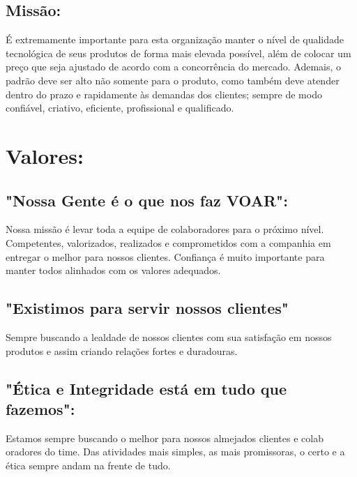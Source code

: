 	
\subsection{Missão:}
	É extremamente importante para esta organização manter o nível de qualidade tecnológica de seus produtos de forma mais elevada possível, além de colocar um preço que seja ajustado de acordo com a concorrência do mercado.
Ademais, o padrão deve ser alto não somente para o produto, como também deve atender dentro do prazo e rapidamente às demandas dos clientes; sempre de modo confiável, criativo, eficiente, profissional e qualificado.


	
    \section{Valores:}

	\begin{description}
 	 \subsection{"Nossa Gente é o que nos faz VOAR":} 
            Nossa missão é levar toda a equipe de colaboradores para o próximo nível.
             Competentes, valorizados, realizados e comprometidos com a companhia em entregar o melhor para nossos clientes.
              Confiança é muito importante para manter todos alinhados com os valores adequados.
            \end{description}

            \begin{description}
                \subsection{"Existimos para servir nossos clientes"} 
                Sempre buscando a lealdade de nossos clientes com
                sua satisfação em nossos produtos e assim criando relações fortes e duradouras.
                \end{description}

                \begin{description}
                    \subsection{"Ética e Integridade está em tudo que fazemos":} 
                    Estamos sempre buscando o melhor para nossos almejados clientes e colab
                    oradores do time. Das atividades mais simples, as mais promissoras, o certo e a
                    ética sempre andam na frente de tudo.
                    \end{description}

